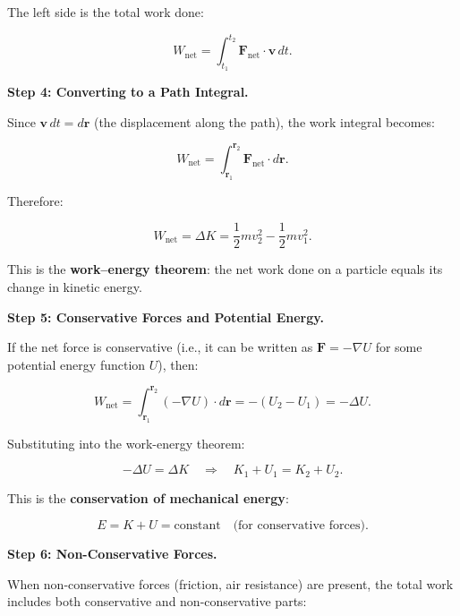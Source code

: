 The left side is the total work done:

\begin{equation}
W_{\text{net}} = \int_{t_1}^{t_2} \mathbf{F}_{\text{net}}\cdot\mathbf{v}\,dt.
\end{equation}

\textbf{Step 4: Converting to a Path Integral.}

Since $\mathbf{v}\,dt = d\mathbf{r}$ (the displacement along the path), the work integral becomes:

\begin{equation}
W_{\text{net}} = \int_{\mathbf{r}_1}^{\mathbf{r}_2} \mathbf{F}_{\text{net}}\cdot d\mathbf{r}.
\end{equation}

Therefore:

\begin{equation}
\boxed{W_{\text{net}} = \Delta K = \frac{1}{2}mv_2^2 - \frac{1}{2}mv_1^2.}
\end{equation}

This is the \textbf{work--energy theorem}: the net work done on a particle equals its change in kinetic energy.

\textbf{Step 5: Conservative Forces and Potential Energy.}

If the net force is conservative (i.e., it can be written as $\mathbf{F} = -\nabla U$ for some potential energy function $U$), then:

\begin{equation}
W_{\text{net}} = \int_{\mathbf{r}_1}^{\mathbf{r}_2} (-\nabla U)\cdot d\mathbf{r} = -(U_2 - U_1) = -\Delta U.
\end{equation}

Substituting into the work-energy theorem:

\begin{equation}
-\Delta U = \Delta K \quad \Longrightarrow \quad K_1 + U_1 = K_2 + U_2.
\end{equation}

This is the \textbf{conservation of mechanical energy}:

\begin{equation}
\boxed{E = K + U = \text{constant} \quad \text{(for conservative forces)}.}
\end{equation}

\textbf{Step 6: Non-Conservative Forces.}

When non-conservative forces (friction, air resistance) are present, the total work includes both conservative and non-conservative parts:

